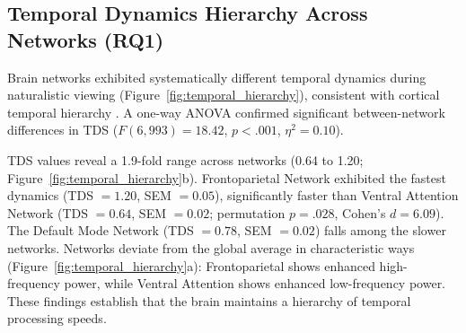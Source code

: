 \documentclass[10pt,letterpaper]{article}
\begin{document}
\subsection{Temporal Dynamics Hierarchy Across Networks (RQ1)}

Brain networks exhibited systematically different temporal dynamics during naturalistic viewing (Figure~\ref{fig:temporal_hierarchy}), consistent with cortical temporal hierarchy \citep{murray2014hierarchy, hasson2008hierarchy}. A one-way ANOVA confirmed significant between-network differences in TDS ($F(6, 993) = 18.42$, $p < .001$, $\eta^2 = 0.10$).

TDS values reveal a 1.9-fold range across networks (0.64 to 1.20; Figure~\ref{fig:temporal_hierarchy}b). Frontoparietal Network exhibited the fastest dynamics (TDS $= 1.20$, SEM $= 0.05$), significantly faster than Ventral Attention Network (TDS $= 0.64$, SEM $= 0.02$; permutation $p = .028$, Cohen's $d = 6.09$). The Default Mode Network (TDS $= 0.78$, SEM $= 0.02$) falls among the slower networks. Networks deviate from the global average in characteristic ways (Figure~\ref{fig:temporal_hierarchy}a): Frontoparietal shows enhanced high-frequency power, while Ventral Attention shows enhanced low-frequency power. These findings establish that the brain maintains a hierarchy of temporal processing speeds.
\end{document}
